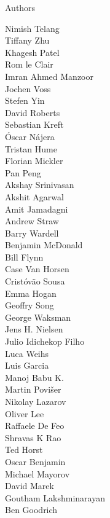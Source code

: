 \documentclass[xcolor=svgnames]{beamer}
\begin{document}
\begin{frame}{Authors}
  \begin{multicols}{5}
    \tiny
    Nimish Telang\\
    Tiffany Zhu\\
    Khagesh Patel\\
    Rom le Clair\\
    Imran Ahmed Manzoor\\
    Jochen Voss\\
    Stefen Yin\\
    David Roberts\\
    Sebastian Kreft\\
    Óscar Nájera\\
    Tristan Hume\\
    Florian Mickler\\
    Pan Peng\\
    Akshay Srinivasan\\
    Akshit Agarwal\\
    Amit Jamadagni\\
    Andrew Straw\\
    Barry Wardell\\
    Benjamin McDonald\\
    Bill Flynn\\
    Case Van Horsen\\
    Cristóvão Sousa\\
    Emma Hogan\\
    Geoffry Song\\
    George Waksman\\
    Jens H. Nielsen\\
    Julio Idichekop Filho\\
    Luca Weihs\\
    Luis Garcia\\
    Manoj Babu K.\\
    Martin Povišer\\
    Nikolay Lazarov\\
    Oliver Lee\\
    Raffaele De Feo\\
    Shravas K Rao\\
    Ted Horst\\
    Oscar Benjamin\\
    Michael Mayorov\\
    David Marek\\
    Goutham Lakshminarayan\\
    Ben Goodrich\\

\end{multicols}
\end{frame}
\end{document}
